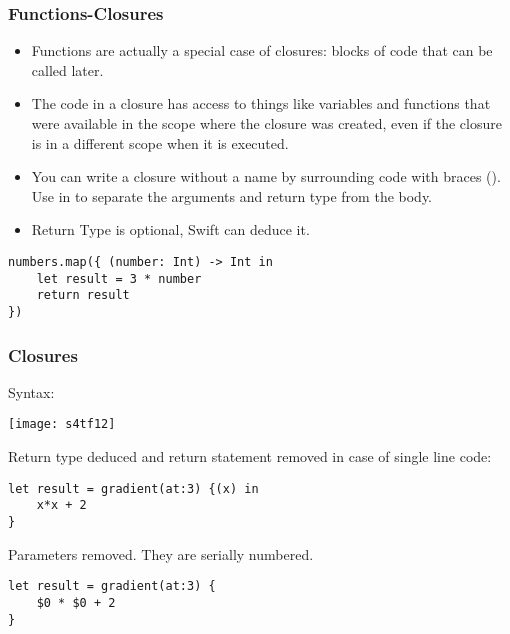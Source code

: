\begin{frame}[fragile] \frametitle{Functions-Closures}
\begin{itemize}
\item Functions are actually a special case of closures: blocks of code that can be called later. 
\item The code in a closure has access to things like variables and functions that were available in the scope where the closure was created, even if the closure is in a different scope when it is executed.
\item You can write a closure without a name by surrounding code with braces ({}). Use in to separate the arguments and return type from the body.
\item Return Type is optional, Swift can deduce it.
\end{itemize}

\begin{lstlisting}
numbers.map({ (number: Int) -> Int in
    let result = 3 * number
    return result
})
\end{lstlisting}


\end{frame}

\begin{frame}[fragile] \frametitle{Closures}

Syntax:

\begin{center}
\texttt{[image: s4tf12]}
\end{center}

Return type deduced and return statement removed in case of single line code:
\begin{lstlisting}
let result = gradient(at:3) {(x) in 
	x*x + 2
}
\end{lstlisting}

Parameters removed. They are serially numbered.
\begin{lstlisting}
let result = gradient(at:3) {
	$0 * $0 + 2
}
\end{lstlisting}



\end{frame}


